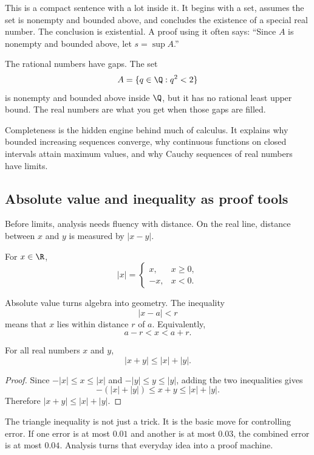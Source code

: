 This is a compact sentence with a lot inside it. It begins with a set, assumes
the set is nonempty and bounded above, and concludes the existence of a special
real number. The conclusion is existential. A proof using it often says:
``Since $A$ is nonempty and bounded above, let $s=\sup A$.''

\begin{intuitionbox}
The rational numbers have gaps. The set
\[
A=\{q\in\Q:q^2<2\}
\]
is nonempty and bounded above inside $\Q$, but it has no rational least upper
bound. The real numbers are what you get when those gaps are filled.
\end{intuitionbox}

Completeness is the hidden engine behind much of calculus. It explains why
bounded increasing sequences converge, why continuous functions on closed
intervals attain maximum values, and why Cauchy sequences of real numbers have
limits.

\subsection{Absolute value and inequality as proof tools}

Before limits, analysis needs fluency with distance. On the real line, distance
between $x$ and $y$ is measured by $|x-y|$.

\begin{definition}
For $x\in\R$,
\[
|x|=\begin{cases}
x, & x\geq 0,\\
-x, & x<0.
\end{cases}
\]
\end{definition}

Absolute value turns algebra into geometry. The inequality
\[
|x-a|<r
\]
means that $x$ lies within distance $r$ of $a$. Equivalently,
\[
a-r<x<a+r.
\]

\begin{theorem}
For all real numbers $x$ and $y$,
\[
|x+y|\leq |x|+|y|.
\]
\end{theorem}

\begin{proof}
Since $-|x|\leq x\leq |x|$ and $-|y|\leq y\leq |y|$, adding the two inequalities
gives
\[
-(|x|+|y|)\leq x+y\leq |x|+|y|.
\]
Therefore $|x+y|\leq |x|+|y|$.
\end{proof}

The triangle inequality is not just a trick. It is the basic move for controlling
error. If one error is at most $0.01$ and another is at most $0.03$, the combined
error is at most $0.04$. Analysis turns that everyday idea into a proof machine.

